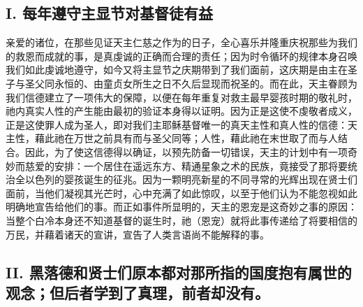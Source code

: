 
\subsection{I. 每年遵守主显节对基督徒有益}

亲爱的诸位，在那些见证天主仁慈之作为的日子，全心喜乐并隆重庆祝那些为我们的救恩而成就的事，是真虔诚的正确而合理的责任；因为时令循环的规律本身召唤我们如此虔诚地遵守，如今又将主显节之庆期带到了我们面前，这庆期是由主在圣子与圣父同永恒的、由童贞女所生之日不久后显现而祝圣的。而在此，天主眷顾为我们信德建立了一项伟大的保障，以便在每年重复对救主最早婴孩时期的敬礼时，祂内真实人性的产生能由最初的验证本身得以证明。因为正是这使不虔敬者成义，正是这使罪人成为圣人，即对我们主耶稣基督唯一的真天主性和真人性的信德：天主性，藉此祂在万世之前具有而与圣父同等；人性，藉此祂在末世取了而与人结合。因此，为了使这信德得以确证，以预先防备一切错误，天主的计划中有一项奇妙而慈爱的安排：一个居住在遥远东方、精通星象之术的民族，竟接受了那将要统治全以色列的婴孩诞生的征兆。因为一颗明亮新星的不同寻常的光辉出现在贤士们面前，当他们凝视其光芒时，心中充满了如此惊叹，以至于他们认为不能忽视如此明确地宣告给他们的事。而正如事件所显明的，天主的恩宠是这奇妙之事的原因：当整个白冷本身还不知道基督的诞生时，祂（恩宠）就将此事传递给了将要相信的万民，并藉着诸天的宣讲，宣告了人类言语尚不能解释的事。\par


\subsection{II. 黑落德和贤士们原本都对那所指的国度抱有属世的观念；但后者学到了真理，前者却没有。}

